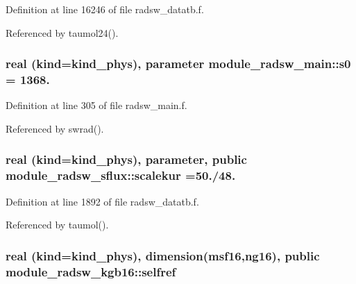Definition at line 16246 of file radsw\+\_\+datatb.\+f.



Referenced by taumol24().

\subsubsection[{\texorpdfstring{s0}{s0}}]{\setlength{\rightskip}{0pt plus 5cm}real (kind=kind\+\_\+phys), parameter module\+\_\+radsw\+\_\+main\+::s0 = 1368.\hspace{0.3cm}{\ttfamily [private]}}\hypertarget{group__module__radsw__main_ga244c149eb05c0675a7e040dbf7e2bc4b}{}\label{group__module__radsw__main_ga244c149eb05c0675a7e040dbf7e2bc4b}


Definition at line 305 of file radsw\+\_\+main.\+f.



Referenced by swrad().

\subsubsection[{\texorpdfstring{scalekur}{scalekur}}]{\setlength{\rightskip}{0pt plus 5cm}real (kind=kind\+\_\+phys), parameter, public module\+\_\+radsw\+\_\+sflux\+::scalekur =50./48.}\hypertarget{group__module__radsw__main_ga2f3280a36f27cea89fc66d71e799cf6d}{}\label{group__module__radsw__main_ga2f3280a36f27cea89fc66d71e799cf6d}


Definition at line 1892 of file radsw\+\_\+datatb.\+f.



Referenced by taumol().

\subsubsection[{\texorpdfstring{selfref}{selfref}}]{\setlength{\rightskip}{0pt plus 5cm}real (kind=kind\+\_\+phys), dimension(msf16,ng16), public module\+\_\+radsw\+\_\+kgb16\+::selfref}\hypertarget{group__module__radsw__main_ga77d98f3fb766d4abfd494332ce67c2c2}{}\label{group__module__radsw__main_ga77d98f3fb766d4abfd494332ce67c2c2}


